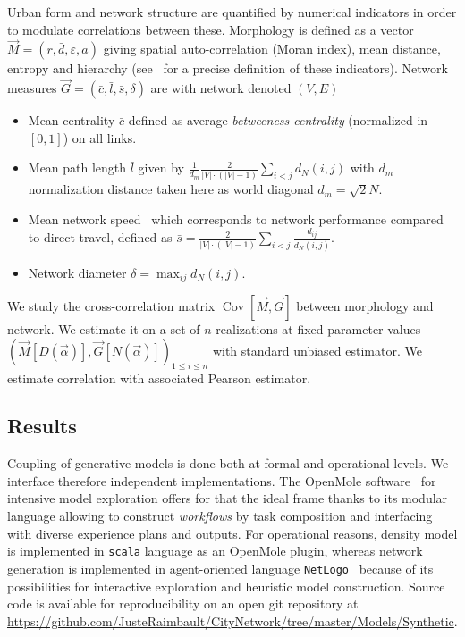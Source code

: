 \documentclass{article}
\DeclareMathOperator{\Cov}{Cov}
\newcommand{\Covb}[2]{\ensuremath{\Cov\!\left[#1,#2\right]}}
\begin{document}
Urban form and network structure are quantified by numerical indicators in order to modulate correlations between these. Morphology is defined as a vector $\vec{M}=(r,\bar{d},\varepsilon,a)$ giving spatial auto-correlation (Moran index), mean distance, entropy and hierarchy (see~\cite{le2015forme} for a precise definition of these indicators). Network measures $\vec{G} = (\bar{c},\bar{l},\bar{s},\delta)$ are with network denoted $(V,E)$
\begin{itemize}
\item Mean centrality $\bar{c}$ defined as average \emph{betweeness-centrality} (normalized in $[0,1]$) on all links.
\item Mean path length $\bar{l}$ given by $\frac{1}{d_m}\frac{2}{|V|\cdot (|V|-1)}\sum_{i<j}d_N(i,j)$ with $d_m$ normalization distance taken here as world diagonal $d_m=\sqrt{2}N$.
\item Mean network speed~\cite{banos2012towards} which corresponds to network performance compared to direct travel, defined as $\bar{s} = \frac{2}{|V|\cdot (|V|-1)}\sum_{i<j}{\frac{d_{ij}}{d_N(i,j)}}$.
\item Network diameter $\delta = \max_{ij}d_N(i,j)$.
\end{itemize}




We study the cross-correlation matrix $\Covb{\vec{M}}{\vec{G}}$ between morphology and network. We estimate it on a set of $n$ realizations at fixed parameter values $(\vec{M}\left[D(\vec{\alpha})\right],\vec{G}\left[N(\vec{\alpha})\right])_{1\leq i\leq n}$ with standard unbiased estimator. We estimate correlation with associated Pearson estimator. 




\subsection*{Results}


Coupling of generative models is done both at formal and operational levels. We interface therefore independent implementations. The OpenMole software~\cite{reuillon2013openmole} for intensive model exploration offers for that the ideal frame thanks to its modular language allowing to construct \emph{workflows} by task composition and interfacing with diverse experience plans and outputs. For operational reasons, density model is implemented in \texttt{scala} language as an OpenMole plugin, whereas network generation is implemented in agent-oriented language \texttt{NetLogo}~\cite{wilensky1999netlogo} because of its possibilities for interactive exploration and heuristic model construction. Source code is available for reproducibility on an open git repository at \url{https://github.com/JusteRaimbault/CityNetwork/tree/master/Models/Synthetic}.
\end{document}
